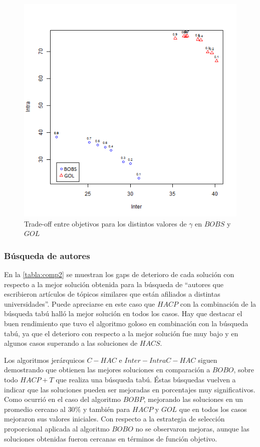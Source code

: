 \begin{figure}[H]
	\centering
	\includegraphics[width=0.60\linewidth]{img/alg2_vs_alg7.png}
	\caption{Trade-off entre objetivos para los distintos valores de $\gamma$ en $BOBS$ y $GOL$}
	\label{res:inter_intra-2-7}
\end{figure}

\subsubsection{Búsqueda de autores}
En la \autoref{tabla:comp2} se muestran los gaps de deterioro de cada solución con respecto a la mejor solución obtenida para la búsqueda de ``autores que escribieron artículos de tópicos similares que están afiliados a distintas universidades''. Puede apreciarse en este caso que $HACP$ con la combinación de la búsqueda tabú halló la mejor solución en todos los casos. Hay que destacar el buen rendimiento que tuvo el algoritmo goloso en combinación con la búsqueda tabú, ya que el deterioro con respecto a la mejor solución fue muy bajo y en algunos casos superando a las soluciones de $HACS$.

Los algoritmos jerárquicos $C-HAC$ e $Inter-Intra C-HAC$ siguen demostrando que obtienen las mejores soluciones en comparación a $BOBO$, sobre todo $HACP+T$ que realiza una búsqueda tabú. Éstas búsquedas vuelven a indicar que las soluciones pueden ser mejoradas en porcentajes muy significativos. Como ocurrió en el caso del algoritmo $BOBP$, mejorando las soluciones en un promedio cercano al $30\%$ y también para $HACP$ y $GOL$ que en todos los casos mejoraron sus valores iniciales. Con respecto a la estrategia de selección proporcional aplicada al algoritmo $BOBO$ no se observaron mejoras, aunque las soluciones obtenidas fueron cercanas en términos de función objetivo. 

